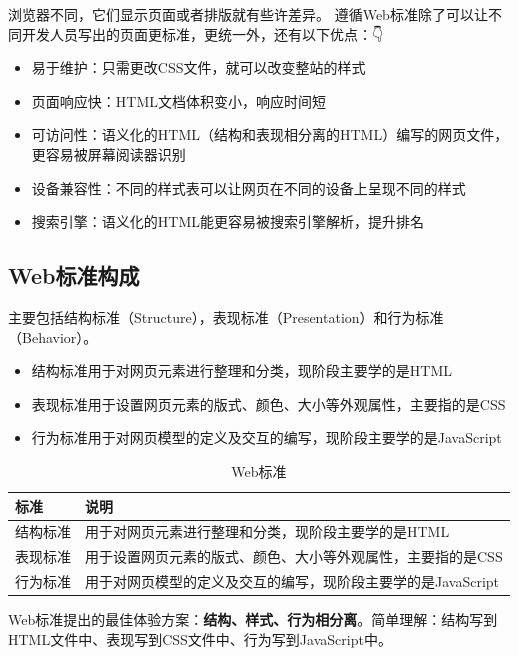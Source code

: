 \documentclass[
]{book}
\providecommand{\tightlist}{%
  \setlength{\itemsep}{0pt}\setlength{\parskip}{0pt}}
\begin{document}
浏览器不同，它们显示页面或者排版就有些许差异。
遵循Web标准除了可以让不同开发人员写出的页面更标准，更统一外，还有以下优点：👇

\begin{itemize}
\tightlist
\item
  易于维护：只需更改CSS文件，就可以改变整站的样式
\item
  页面响应快：HTML文档体积变小，响应时间短
\item
  可访问性：语义化的HTML（结构和表现相分离的HTML）编写的网页文件，更容易被屏幕阅读器识别
\item
  设备兼容性：不同的样式表可以让网页在不同的设备上呈现不同的样式
\item
  搜索引擎：语义化的HTML能更容易被搜索引擎解析，提升排名
\end{itemize}

\hypertarget{webux6807ux51c6ux6784ux6210}{%
\subsection{Web标准构成}\label{webux6807ux51c6ux6784ux6210}}

主要包括结构标准（Structure），表现标准（Presentation）和行为标准（Behavior）。

\begin{itemize}
\tightlist
\item
  结构标准用于对网页元素进行整理和分类，现阶段主要学的是HTML
\item
  表现标准用于设置网页元素的版式、颜色、大小等外观属性，主要指的是CSS
\item
  行为标准用于对网页模型的定义及交互的编写，现阶段主要学的是JavaScript
\end{itemize}

\begin{table}

\caption{\label{tab:unnamed-chunk-2}Web标准}
\centering
\begin{tabular}[t]{ll}
\toprule
标准 & 说明\\
\midrule
结构标准 & 用于对网页元素进行整理和分类，现阶段主要学的是HTML\\
表现标准 & 用于设置网页元素的版式、颜色、大小等外观属性，主要指的是CSS\\
行为标准 & 用于对网页模型的定义及交互的编写，现阶段主要学的是JavaScript\\
\bottomrule
\end{tabular}
\end{table}

Web标准提出的最佳体验方案：\textbf{结构、样式、行为相分离}。简单理解：结构写到HTML文件中、表现写到CSS文件中、行为写到JavaScript中。
\end{document}
